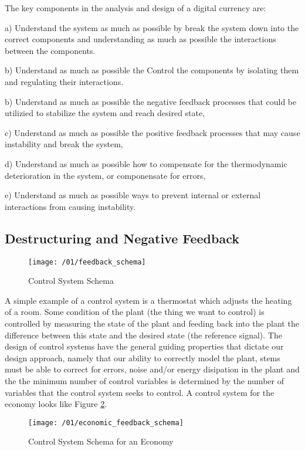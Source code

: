 The key components in the analysis and design of a digital currency are:

a) Understand the system as much as possible by break the system down into the correct components
and understanding as much as possible the interactions between the components.

b) Understand as much as possible the Control the components by isolating them and regulating their
interactions.

b) Understand as much as possible the  negative feedback processes that could be utilizied to
stabilize the system and reach desired state,

c) Understand as much as possible the positive feedback processes that may cause instability and
break the system,

d) Understand as much as possible how to compensate for the thermodynamic deterioration in the
system, or componensate for errors,

e) Understand as much as possible ways to prevent internal or external interactions from causing instability.

\subsection{Destructuring and Negative Feedback}

\begin{figure}
\texttt{[image: /01/feedback\_schema]}
\caption{Control System Schema}
\label{fig:feedback_schema}
\end{figure}

A simple example of a control system is a thermostat which adjusts the heating of a room. Some
condition of the plant (the thing we want to control) is controlled by measuring the state of the
plant and feeding back into the plant the difference between this state and the desired state (the
reference signal). The design of control systems have the general guiding properties that dictate
our design approach, namely that our ability to correctly model the plant, stems must be able to
correct for errors, noise and/or energy disipation in the plant and the the minimum number of
control variables is determined by the number of variables that the control system seeks to control.
A control system for the economy looks like Figure \ref{fig:economic_feedback_schema}.

\begin{figure}
\centering
\texttt{[image: /01/economic\_feedback\_schema]}
\caption{Control System Schema for an Economy}
\label{fig:economic_feedback_schema}
\end{figure}

